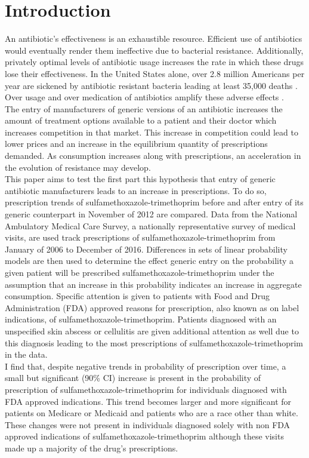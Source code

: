 \chapter{Introduction}
An antibiotic's effectiveness is an exhaustible resource. Efficient use of antibiotics would eventually render them ineffective due to bacterial resistance. Additionally, privately optimal levels of antibiotic usage increases the rate in which these drugs lose their effectiveness. In the United States alone, over 2.8 million Americans per year are sickened by antibiotic resistant bacteria leading at least 35,000 deaths \cite{centers_for_disease_control_and_prevention_us_antibiotic_2019}. Over usage and over medication of antibiotics amplify these adverse effects \cite{gerber_outpatient_2019}.\\
\indent The entry of manufacturers of generic versions of an antibiotic increases the amount of treatment options available to a patient and their doctor which increases competition in that market. This increase in competition could lead to lower prices and an increase in the equilibrium quantity of prescriptions demanded. As consumption increases along with prescriptions, an acceleration in the evolution of resistance may develop.\\
\indent This paper aims to test the first part this hypothesis that entry of generic antibiotic manufacturers leads to an increase in prescriptions. To do so, prescription trends of sulfamethoxazole-trimethoprim before and after entry of its generic counterpart in November of 2012 are compared. Data from the National Ambulatory Medical Care Survey, a nationally representative survey of medical visits, are used track prescriptions of sulfamethoxazole-trimethoprim from January of 2006 to December of 2016. Differences in sets of linear probability models are then used to determine the effect generic entry on the probability a given patient will be prescribed sulfamethoxazole-trimethoprim under the assumption that an increase in this probability indicates an increase in aggregate consumption. Specific attention is given to patients with Food and Drug Administration (FDA) approved reasons for prescription, also known as on label indications, of sulfamethoxazole-trimethoprim. Patients diagnosed with an unspecified skin abscess or cellulitis are given additional attention as well due to this diagnosis leading to the most prescriptions of sulfamethoxazole-trimethoprim in the data.\\
\indent I find that, despite negative trends in probability of prescription over time, a small but significant (90\% CI) increase is present in the probability of prescription of sulfamethoxazole-trimethoprim for individuals diagnosed with FDA approved indications. This trend becomes larger and more significant for patients on Medicare or Medicaid and patients who are a race other than white. These changes were not present in individuals diagnosed solely with non FDA approved indications of sulfamethoxazole-trimethoprim although these visits made up a majority of the drug's prescriptions.\\

